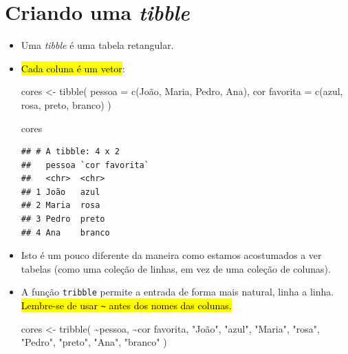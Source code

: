 \documentclass[
  11pt]{report}
\newenvironment{Shaded}{\begin{snugshade}}{\end{snugshade}}
\newcommand{\AttributeTok}[1]{\textcolor[rgb]{0.77,0.63,0.00}{#1}}
\newcommand{\FunctionTok}[1]{\textcolor[rgb]{0.00,0.00,0.00}{#1}}
\newcommand{\NormalTok}[1]{#1}
\newcommand{\OtherTok}[1]{\textcolor[rgb]{0.56,0.35,0.01}{#1}}
\newcommand{\SpecialCharTok}[1]{\textcolor[rgb]{0.00,0.00,0.00}{#1}}
\newcommand{\StringTok}[1]{\textcolor[rgb]{0.31,0.60,0.02}{#1}}
\renewenvironment{Shaded}{
    \begin{mdframed}[%
      roundcorner=2pt,%
      innerleftmargin=5pt,%
      innerrightmargin=5pt,%
      topline=true,%
      leftline=true,%
      rightline=true,%
      bottomline=true,%
      linewidth=0.5pt,%
      linecolor=black!20,%
      backgroundcolor=black!2,%
      skipabove=2ex,%
      skipbelow=2.5ex%
    ]%
  }
  {
    \end{mdframed}
  }
\begin{document}
\hypertarget{criando-uma-tibble}{%
\section{\texorpdfstring{Criando uma \emph{tibble}}{Criando uma tibble}}\label{criando-uma-tibble}}

\begin{itemize}
\item
  Uma \emph{tibble} é uma tabela retangular.
\item
  {\hl{Cada coluna é um vetor}}:

\begin{Shaded}
\begin{Highlighting}[]
\NormalTok{cores }\OtherTok{\textless{}{-}} \FunctionTok{tibble}\NormalTok{(}
  \AttributeTok{pessoa =} \FunctionTok{c}\NormalTok{(}\StringTok{\textquotesingle{}João\textquotesingle{}}\NormalTok{, }\StringTok{\textquotesingle{}Maria\textquotesingle{}}\NormalTok{, }\StringTok{\textquotesingle{}Pedro\textquotesingle{}}\NormalTok{, }\StringTok{\textquotesingle{}Ana\textquotesingle{}}\NormalTok{),}
  \StringTok{\textquotesingle{}cor favorita\textquotesingle{}} \OtherTok{=} \FunctionTok{c}\NormalTok{(}\StringTok{\textquotesingle{}azul\textquotesingle{}}\NormalTok{, }\StringTok{\textquotesingle{}rosa\textquotesingle{}}\NormalTok{, }\StringTok{\textquotesingle{}preto\textquotesingle{}}\NormalTok{, }\StringTok{\textquotesingle{}branco\textquotesingle{}}\NormalTok{)}
\NormalTok{)}

\NormalTok{cores}
\end{Highlighting}
\end{Shaded}

\begin{verbatim}
## # A tibble: 4 x 2
##   pessoa `cor favorita`
##   <chr>  <chr>         
## 1 João   azul          
## 2 Maria  rosa          
## 3 Pedro  preto         
## 4 Ana    branco
\end{verbatim}
\item
  Isto é um pouco diferente da maneira como estamos acostumados a ver tabelas (como uma coleção de linhas, em vez de uma coleção de colunas).
\item
  A função \texttt{tribble} permite a entrada de forma mais natural, linha a linha. {\hl{Lembre-se de usar {\mbox{\texttt{\textasciitilde{}}}} antes dos nomes das colunas.}}

\begin{Shaded}
\begin{Highlighting}[]
\NormalTok{cores }\OtherTok{\textless{}{-}} \FunctionTok{tribble}\NormalTok{(}
  \SpecialCharTok{\textasciitilde{}}\NormalTok{pessoa, }\SpecialCharTok{\textasciitilde{}}\StringTok{\textquotesingle{}cor favorita\textquotesingle{}}\NormalTok{,}
   \StringTok{"João"}\NormalTok{,          }\StringTok{"azul"}\NormalTok{,}
  \StringTok{"Maria"}\NormalTok{,          }\StringTok{"rosa"}\NormalTok{,}
  \StringTok{"Pedro"}\NormalTok{,         }\StringTok{"preto"}\NormalTok{,}
    \StringTok{"Ana"}\NormalTok{,        }\StringTok{"branco"}
\NormalTok{)}


\end{Highlighting}
\end{Shaded}
\end{itemize}
\end{document}
